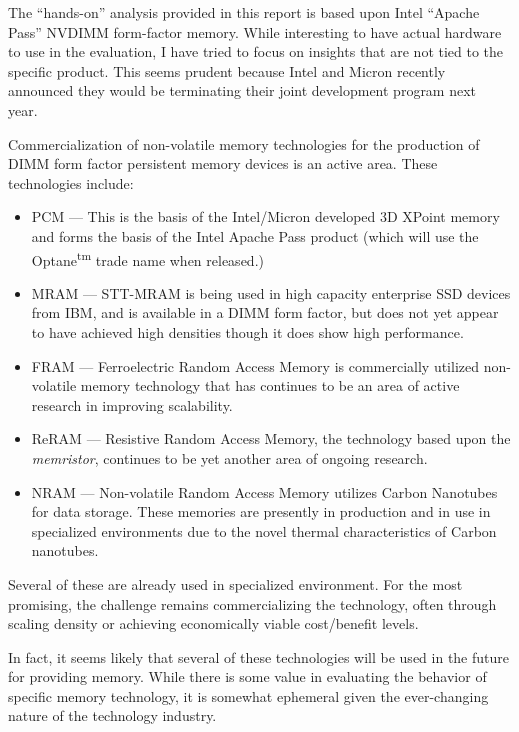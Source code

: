 The ``hands-on'' analysis provided in this report is based upon Intel ``Apache Pass'' \acs{NVDIMM}
form-factor memory.  While interesting to have actual hardware to use in the evaluation, I have
tried to focus on insights that are not tied to the specific product.  This seems prudent because
Intel and Micron recently announced they would be terminating their joint development program 
next year.~\cite{Intel:3DXPoint:JDP:July:2018}

Commercialization of non-volatile memory technologies for the production of DIMM form factor
persistent memory devices is an active area.  These technologies include:

\begin{itemize}
    \item \acs{PCM} --- This is the basis of the Intel/Micron developed 3D XPoint memory and
    forms the basis of the Intel Apache Pass product (which will use the Optane\textsuperscript{tm} trade name
    when released.)
    \item \acs{MRAM} --- STT-MRAM is being used in high capacity enterprise SSD devices from IBM, and is
    available in a DIMM form factor, but does not yet appear to have achieved high densities though it
    does show high performance.~\cite{MRAM-info}
    \item \acs{FRAM} --- Ferroelectric Random Access Memory is commercially utilized non-volatile memory
    technology that has continues to be an area of active research in improving scalability.~\cite{mikolajick2018ferroelectric}
    \item \acs{ReRAM} --- Resistive Random Access Memory, the technology based upon the \textit{memristor}, continues
    to be yet another area of ongoing research.\cite{zhu2017resistive,lastras2018resistive}
    \item \acs{NRAM} --- Non-volatile Random Access Memory utilizes Carbon Nanotubes for data storage.  These memories
    are presently in production and in use in specialized environments due to the novel thermal characteristics of Carbon
    nanotubes.~\cite{gilmer2018nram}
\end{itemize}

Several of these are already used in specialized environment.  For the most promising, the challenge remains
commercializing the technology, often through scaling density or achieving economically viable cost/benefit levels.

In fact, it seems likely that several of these technologies will be used in the future for providing memory.  While
there is some value in evaluating the behavior of specific memory technology, it is somewhat ephemeral given the
ever-changing nature of the technology industry.


